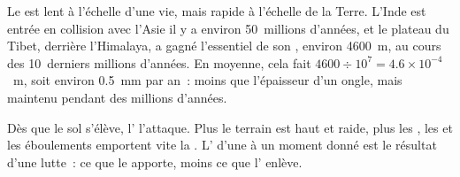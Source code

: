 Le  est lent à l'échelle d'une vie, mais rapide à l'échelle de
la Terre. L'Inde est entrée en collision avec l'Asie il y a environ
50~millions d'années, et le plateau du Tibet, derrière l'Himalaya, a gagné
l'essentiel de son , environ \qty{4600}{m}, au cours des
10~derniers millions d'années. En moyenne, cela fait
$4600 \div 10^7 = 4.6 \times 10^{-4}$~m, soit environ \qty{0.5}{mm} par
an~: moins que l'épaisseur d'un ongle, mais maintenu pendant des millions
d'années.

Dès que le sol s'élève, l' l'attaque. Plus le terrain est haut et
raide, plus les , les  et les éboulements emportent vite
la . L' d'une  à un moment donné est le
résultat d'une lutte~: ce que le  apporte, moins ce que
l' enlève.

